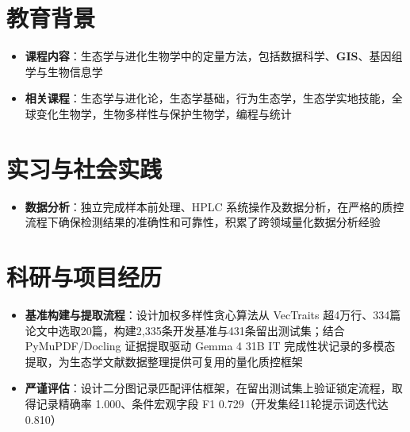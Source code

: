 \documentclass{my-resume}
\begin{document}


\section{教育背景}
\begin{itemize}[parsep=0.2ex]
  \item \textbf{课程内容}：生态学与进化生物学中的定量方法，包括数据科学、\textbf{GIS}、基因组学与生物信息学
\end{itemize}
\begin{itemize}[parsep=0.2ex]
  \item \textbf{相关课程}：生态学与进化论，生态学基础，行为生态学，生态学实地技能，全球变化生物学，生物多样性与保护生物学，编程与统计
\end{itemize}

\section{实习与社会实践}
\begin{itemize}[parsep=0.2ex]
  \item \textbf{数据分析}：独立完成样本前处理、HPLC 系统操作及数据分析，在严格的质控流程下确保检测结果的准确性和可靠性，积累了跨领域量化数据分析经验
\end{itemize}

\section{科研与项目经历}

\begin{itemize}[parsep=0.2ex]
  \item \textbf{基准构建与提取流程}：设计加权多样性贪心算法从 VecTraits 超4万行、334篇论文中选取20篇，构建2,335条开发基准与431条留出测试集；结合 PyMuPDF/Docling 证据提取驱动 Gemma 4 31B IT 完成性状记录的多模态提取，为生态学文献数据整理提供可复用的量化质控框架
  \item \textbf{严谨评估}：设计二分图记录匹配评估框架，在留出测试集上验证锁定流程，取得记录精确率 1.000、条件宏观字段 F1 0.729（开发集经11轮提示词迭代达 0.810）
\end{itemize}
\end{document}
